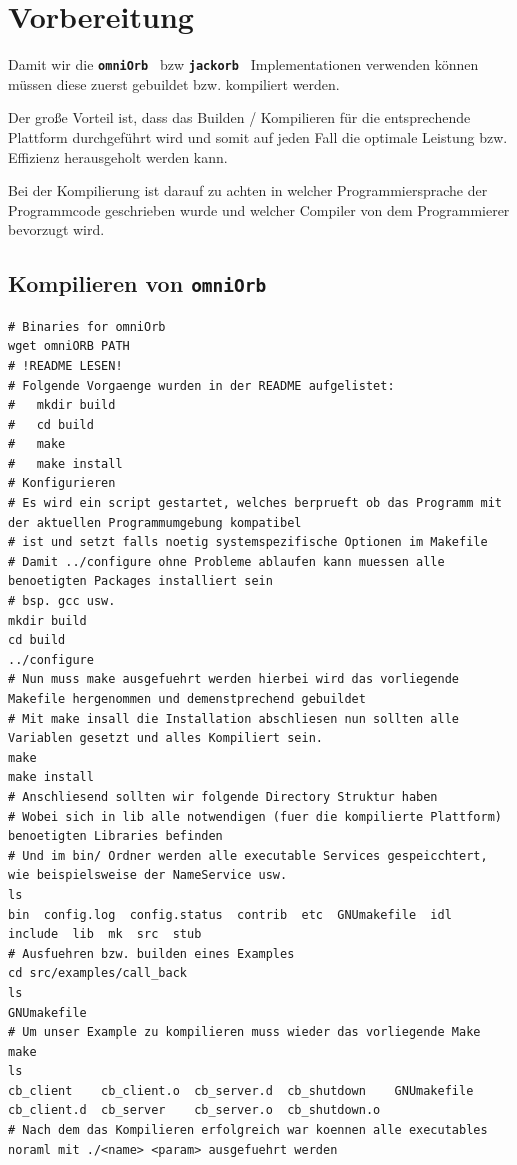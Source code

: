 \section{Vorbereitung \cite{ubuntuCompile}}
Damit wir die \textbf{\texttt{omniOrb \cite{omniOrb}}} bzw \textbf{\texttt{jackorb \cite{jackorb}}} Implementationen verwenden können müssen diese zuerst gebuildet bzw. kompiliert werden.

Der große Vorteil ist, dass das Builden / Kompilieren für die entsprechende Plattform durchgeführt wird und somit auf jeden Fall die optimale Leistung bzw. Effizienz herausgeholt werden kann.

Bei der Kompilierung ist darauf zu achten in welcher Programmiersprache der Programmcode geschrieben wurde und welcher Compiler von dem Programmierer bevorzugt wird.\\

\subsection{Kompilieren von \texttt{omniOrb \cite{omniOrb}}}

\begin{lstlisting}[style=BashInputStyle, caption=Compiling omniOrb \cite{ubuntuConfigure}]
# Binaries for omniOrb
wget omniORB PATH
# !README LESEN!
# Folgende Vorgaenge wurden in der README aufgelistet:
#	mkdir build
#	cd build
#	make
#	make install
# Konfigurieren
# Es wird ein script gestartet, welches berprueft ob das Programm mit der aktuellen Programmumgebung kompatibel
# ist und setzt falls noetig systemspezifische Optionen im Makefile
# Damit ../configure ohne Probleme ablaufen kann muessen alle benoetigten Packages installiert sein
# bsp. gcc usw.
mkdir build
cd build
../configure
# Nun muss make ausgefuehrt werden hierbei wird das vorliegende Makefile hergenommen und demenstprechend gebuildet
# Mit make insall die Installation abschliesen nun sollten alle Variablen gesetzt und alles Kompiliert sein.
make
make install
# Anschliesend sollten wir folgende Directory Struktur haben
# Wobei sich in lib alle notwendigen (fuer die kompilierte Plattform) benoetigten Libraries befinden
# Und im bin/ Ordner werden alle executable Services gespeicchtert, wie beispielsweise der NameService usw.
ls
bin  config.log  config.status  contrib  etc  GNUmakefile  idl  include  lib  mk  src  stub
# Ausfuehren bzw. builden eines Examples
cd src/examples/call_back
ls
GNUmakefile
# Um unser Example zu kompilieren muss wieder das vorliegende Make 
make
ls
cb_client    cb_client.o  cb_server.d  cb_shutdown    GNUmakefile
cb_client.d  cb_server    cb_server.o  cb_shutdown.o
# Nach dem das Kompilieren erfolgreich war koennen alle executables noraml mit ./<name> <param> ausgefuehrt werden

\end{lstlisting}

